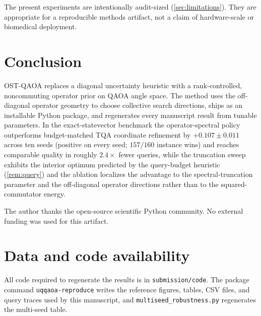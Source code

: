 \documentclass[aps,prresearch,reprint,amsmath,amssymb,floatfix,nofootinbib,superscriptaddress,longbibliography]{revtex4-2}
\theoremstyle{remark}
\newcommand{\OSTQAOA}{\textnormal{\textsc{OST-QAOA}}}
\newcommand{\TQA}{\textnormal{\textsc{TQA}}}
\begin{document}
The present experiments are intentionally audit-sized (\cref{sec:limitations}).
They are appropriate for a reproducible methods artifact, not a claim of
hardware-scale or biomedical deployment.

\section{Conclusion}

\OSTQAOA{} replaces a diagonal uncertainty heuristic with a rank-controlled,
noncommuting operator prior on QAOA angle space.  The method uses the off-diagonal
operator geometry to choose collective search directions, ships as an installable
Python package, and regenerates every manuscript result from tunable parameters.
In the exact-statevector benchmark the operator-spectral policy outperforms
budget-matched \TQA{} coordinate refinement by \(+0.107\pm0.011\) across ten seeds
(positive on every seed; \(157/160\) instance wins) and reaches comparable
quality in roughly \(2.4\times\) fewer queries, while the truncation sweep
exhibits the interior optimum predicted by the query-budget heuristic
(\cref{rem:query}) and the ablation localizes the advantage to the
spectral-truncation parameter and the off-diagonal operator directions rather than
to the squared-commutator energy.

\begin{acknowledgments}
The author thanks the open-source scientific Python community.  No external
funding was used for this artifact.
\end{acknowledgments}

\section*{Data and code availability}
All code required to regenerate the results is in \texttt{submission/code}.  The
package command \texttt{uqqaoa-reproduce} writes the reference figures, tables,
CSV files, and query traces used by this manuscript, and
\texttt{multiseed\_robustness.py} regenerates the multi-seed table.



\end{document}
